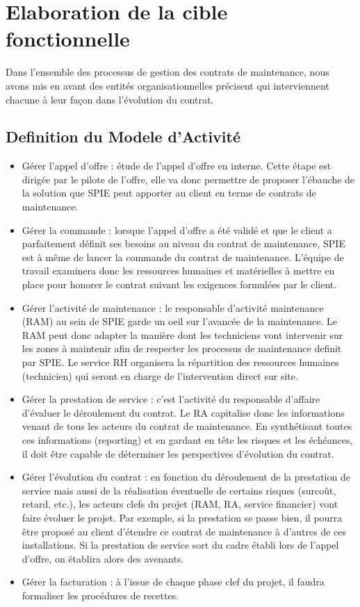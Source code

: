 \section{Elaboration de la cible fonctionnelle}
Dans l'ensemble des processus de gestion des contrats de maintenance, nous avons mis en avant des entités organisationnelles précisent qui interviennent chacune à leur façon dans l'évolution du contrat.

\subsection{Definition du Modele d'Activité} 

\begin{itemize}
\item Gérer l'appel d'offre : étude de l'appel d'offre en interne. Cette étape est dirigée par le pilote de l'offre, elle va donc permettre de proposer l'ébauche de la solution que SPIE peut apporter au client en terme de contrats de maintenance.
\item Gérer la commande : lorsque l'appel d'offre a été validé et que le client a parfaitement définit ses besoins au niveau du contrat de maintenance, SPIE est à même de lancer la \og commande \fg du contrat de maintenance. L'équipe de travail examinera donc les ressources humaines et matérielles à mettre en place pour honorer le contrat suivant les exigences formulées par le client.
\item Gérer l'activité de maintenance : le responsable d'activité maintenance (RAM) au sein de SPIE garde un oeil sur l'avancée de la maintenance. Le RAM peut donc adapter la manière dont les techniciens vont intervenir sur les zones à maintenir afin de respecter les processus de maintenance definit par SPIE. Le service RH organisera la répartition des ressources humaines (technicien) qui seront en charge de l'intervention direct sur site.
\item Gérer la prestation de service : c'est l'activité du responsable d'affaire d'évaluer le déroulement du contrat. Le RA capitalise donc les informations venant de tous les acteurs du contrat de maintenance. En synthétisant toutes ces informations (reporting) et en gardant en tête les risques et les échéances, il doit être capable de déterminer les perspectives d'évolution du contrat.
\item Gérer l'évolution du contrat : en fonction du déroulement de la prestation de service mais aussi de la réalisation éventuelle de certains risques (surcoût, retard, etc.), les acteurs clefs du projet (RAM, RA, service financier) vont faire évoluer le projet. Par exemple, si la prestation se passe bien, il pourra être proposé au client d'étendre ce contrat de maintenance à d'autres de ces installations. Si la prestation de service sort du cadre établi lors de l'appel d'offre, on établira alors des avenants.
\item Gérer la facturation : à l'issue de chaque phase clef du projet, il faudra formaliser les procédures de recettes. 
\end{itemize}


